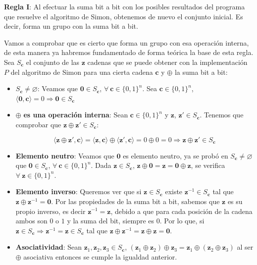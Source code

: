  \textbf{Regla I}: Al efectuar la suma bit a bit con los posibles resultados del programa que resuelve el algoritmo de Simon, obtenemos de nuevo el conjunto inicial. Es decir, forma un grupo con la suma bit a bit. \newline

 Vamos a comprobar que es cierto que forma un grupo con esa operación interna, de esta manera ya habremos fundamentado de forma teórica la base de esta regla. Sea $S_{\mathbf{c}}$ el conjunto de las $\mathbf{z}$ cadenas que se puede obtener con la implementación $P$ del algoritmo de Simon para una cierta cadena $\mathbf{c}$ y $\oplus$ la suma bit a bit:

 \begin{itemize}
     \item $S_{\mathbf{c}} \neq \varnothing$: Veamos que $\mathbf{0} \in S_{\mathbf{c}}$, $\forall\: \mathbf{c} \in \{0,1\}^{n}$. Sea $\mathbf{c} \in \{0,1\}^{n}$, $\langle\mathbf{0},\mathbf{c}\rangle=0 \Rightarrow \mathbf{0} \in S_{\mathbf{c}}$

     \item $\oplus$ \textbf{es una operación interna}: Sean $\mathbf{c} \in \{0,1\}^{n}$ y $\mathbf{z}$, $\mathbf{z}' \in S_{\mathbf{c}}$. Tenemos que comprobar que $\mathbf{z} \oplus\mathbf{z}' \in S_{\mathbf{c}}$:

     \begin{equation}
         \langle\mathbf{z} \oplus \mathbf{z}', \mathbf{c} \rangle = \langle\mathbf{z}, \mathbf{c} \rangle \oplus \langle \mathbf{z}', \mathbf{c} \rangle = 0\oplus0=0 \Rightarrow \mathbf{z} \oplus\mathbf{z}' \in S_{\mathbf{c}}
     \end{equation}
    
     \item \textbf{Elemento neutro}: Veamos que $\mathbf{0}$ es elemento neutro, ya se probó en $S_{\mathbf{c}} \neq \varnothing$ que $\mathbf{0} \in S_{\mathbf{c}}$, $ \forall \:\mathbf{c} \in \{0,1\}^{n}$. Dada $\mathbf{z} \in S_{\mathbf{c}}$, $\mathbf{z} \oplus \mathbf{0} = \mathbf{z} = \mathbf{0} \oplus \mathbf{z}$, se verifica $\forall \:\mathbf{z} \in \{0,1\}^{n}$.

     \item \textbf{Elemento inverso}: Queremos ver que si $\mathbf{z} \in S_{\mathbf{c}}$ existe $\mathbf{z}^{-1} \in S_{\mathbf{c}}$ tal que $\mathbf{z}\oplus\mathbf{z}^{-1}=\mathbf{0}$. Por las propiedades de la suma bit a bit, sabemos que $\mathbf{z}$ es su propio inverso, es decir $\mathbf{z}^{-1}=\mathbf{z}$, debido a que para cada posición de la cadena ambos son $0$ o $1$ y la suma del bit, siempre es $0$. Por lo que, si $\mathbf{z} \in S_{\mathbf{c}} \Rightarrow \mathbf{z}^{-1} = \mathbf{z} \in S_{\mathbf{c}}$ tal que $\mathbf{z}\oplus\mathbf{z}^{-1}=\mathbf{z}\oplus\mathbf{z}=\mathbf{0}$.

     \item \textbf{Asociatividad}: Sean $\mathbf{z}_{1}, \mathbf{z}_{2}, \mathbf{z}_{3} \in S_{\mathbf{c}}$, $(\mathbf{z}_{1}\oplus \mathbf{z}_{2}) \oplus \mathbf{z}_{3} = \mathbf{z}_{1} \oplus( \mathbf{z}_{2} \oplus \mathbf{z}_{3})$ al ser $\oplus$ asociativa entonces se cumple la igualdad anterior.
 \end{itemize}

